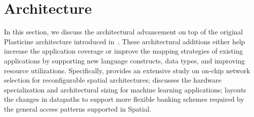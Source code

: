 \chapter{Architecture} \label{sec:arch}

In this section, we discuss the architectural advancement on top of the original Plasticine architecture
introduced in~\cite{plasticine}. These architectural additions either help increase the application
coverage or improve the mapping strategies of existing applications by supporting new language
constructs, data types, and improving resource utilizations.
Specifically,  provides an extensive study on on-chip network selection for
reconfigurable spatial architectures;
 discusses the hardware specialization and architectural sizing for machine
learning applications; 
 layouts the changes in datapaths to support more
flexible banking schemes required by the general access patterns supported in Spatial.




%
%
%
